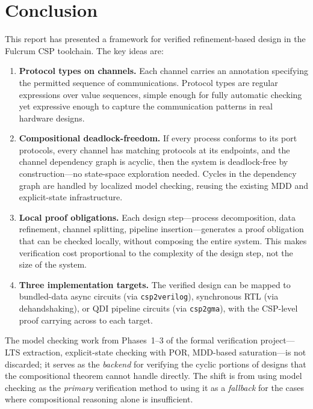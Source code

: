 \documentclass[11pt]{article}
\begin{document}
\section{Conclusion}
\label{sec:conclusion}

This report has presented a framework for verified refinement-based
design in the Fulcrum CSP toolchain.  The key ideas are:

\begin{enumerate}
\item \textbf{Protocol types on channels.}  Each channel carries an
  annotation specifying the permitted sequence of communications.
  Protocol types are regular expressions over value sequences,
  simple enough for fully automatic checking yet expressive enough to
  capture the communication patterns in real hardware designs.

\item \textbf{Compositional deadlock-freedom.}  If every process
  conforms to its port protocols, every channel has matching protocols at
  its endpoints, and the channel dependency graph is acyclic, then the
  system is deadlock-free by construction---no state-space exploration
  needed.  Cycles in the dependency graph are handled by localized
  model checking, reusing the existing MDD and explicit-state
  infrastructure.

\item \textbf{Local proof obligations.}  Each design step---process
  decomposition, data refinement, channel splitting, pipeline
  insertion---generates a proof obligation that can be checked locally,
  without composing the entire system.  This makes verification cost
  proportional to the complexity of the design step, not the size of
  the system.

\item \textbf{Three implementation targets.}  The verified design can
  be mapped to bundled-data async circuits (via \texttt{csp2verilog}),
  synchronous RTL (via dehandshaking), or QDI pipeline circuits (via
  \texttt{csp2gma}), with the CSP-level proof carrying across to each
  target.
\end{enumerate}

The model checking work from Phases~1--3 of the formal verification
project---LTS extraction, explicit-state checking with POR, MDD-based
saturation---is not discarded; it serves as the \emph{backend} for
verifying the cyclic portions of designs that the compositional theorem
cannot handle directly.  The shift is from using model checking as the
\emph{primary} verification method to using it as a \emph{fallback}
for the cases where compositional reasoning alone is insufficient.
\end{document}
